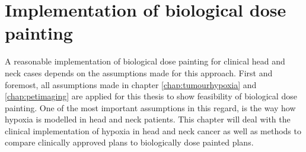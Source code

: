 \section{Implementation of biological dose painting}\label{chapt:clinicalimplementation}
A reasonable implementation of biological dose painting for clinical head and neck cases depends on the assumptions made for this approach. First and foremost, all assumptions made in chapter \ref{chap:tumourhypoxia} and \ref{chap:petimaging} are applied for this thesis to show feasibility of biological dose painting. One of the most important assumptions in this regard, is the way how hypoxia is modelled in head and neck patients. This chapter will deal with the clinical implementation of hypoxia in head and neck cancer as well as methods to compare clinically approved plans to biologically dose painted plans.
